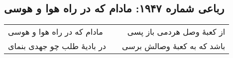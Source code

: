 \begin{center}
\section*{رباعی شماره ۱۹۴۷: مادام که در راه هوا و هوسی}
\label{sec:1947}
\begin{longtable}{l p{0.5cm} r}
مادام که در راه هوا و هوسی
&&
از کعبهٔ وصل هردمی باز پسی
\\
در بادیهٔ طلب چو جهدی بنمای
&&
باشد که به کعبهٔ وصالش برسی
\\
\end{longtable}
\end{center}
